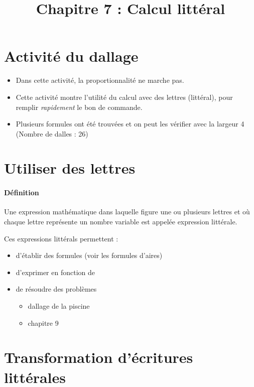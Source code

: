 \documentclass[
	a4paper,
	twocolumn=false,
	12pts,
	DIV=calc]%
	{scrartcl}
\title{Chapitre 7 : Calcul littéral}
\begin{document}
\maketitle
\section*{Activité du dallage}
\begin{itemize}
	\item Dans cette activité, la proportionnalité ne marche pas.
	\item Cette activité montre l’utilité du calcul avec des lettres (littéral), pour remplir \emph{rapidement} le bon de commande.
	\item Plusieurs formules ont été trouvées et on peut les vérifier avec la largeur 4 (Nombre de dalles : 26)
\end{itemize}

\section{Utiliser des lettres}

\paragraph{Définition} Une expression mathématique dans laquelle figure une ou plusieurs lettres et
où chaque lettre représente un nombre variable est appelée expression littérale.

Ces expressions littérals permettent :

\begin{itemize}
	\item d’établir des formules (voir les formules d’aires)
	\item d’exprimer \og en fonction de\fg
	[figure rectangle : Caption = "Le périmètre du rectangle ABCD en fonction de x est : $pABCD = 7 + 4x + 7 + 4x = 14 + 8x$"]
	\item de résoudre des problèmes
	\begin{itemize}
		\item dallage de la piscine
		\item chapitre 9
	\end{itemize}
\end{itemize}

\section{Transformation d'écritures littérales}
\end{document}
